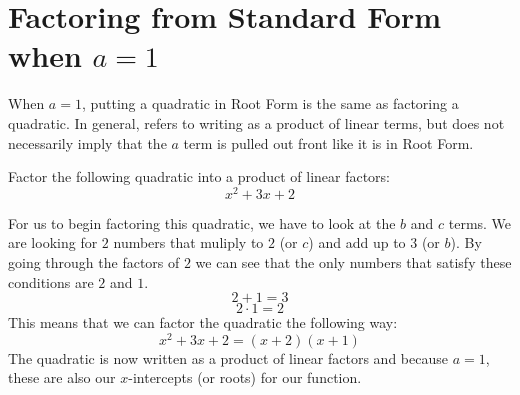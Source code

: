 \documentclass{ximera}
\begin{document}
\section{Factoring from Standard Form when $a=1$}
When $a=1$, putting a quadratic in Root Form is the same as factoring a quadratic.  In general,  refers to writing as a product of linear terms, but does not necessarily imply that the $a$ term is pulled out front like it is in Root Form.  

\begin{example}
Factor the following quadratic into a product of linear factors:
\[
x^2+3x+2
\]

\begin{explanation}
For us to begin factoring this quadratic, we have to look at the $b$ and $c$ terms. We are looking for $2$ numbers that muliply to $2$ (or $c$) and add up to $3$ (or $b$). By going through the factors of $2$ we can see that the only numbers that satisfy these conditions are $2$ and $1$.
\[
2+1=3
\]
\[
2\cdot 1=2
\]
This means that we can factor the quadratic the following way:
\[
x^2+3x+2=(x+2)(x+1)
\]
The quadratic is now written as a product of linear factors and because $a=1$, these are also our $x$-intercepts (or roots) for our function.
\end{explanation}
\end{example}

\end{document}
